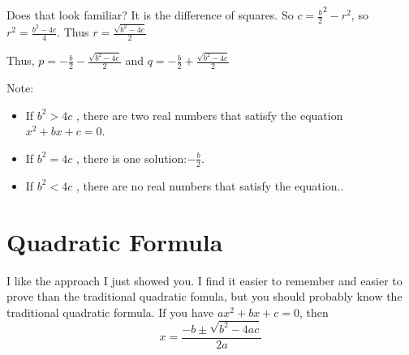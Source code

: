 Does that look familiar? It is the difference of squares.  So
$c = \frac{b}{2}^2 - r^2$, so $r^2 = \frac{b^2 - 4c}{4}$. Thus $r = \frac{\sqrt{b^2 - 4c}}{2}$

Thus, $p = -\frac{b}{2} - \frac{\sqrt{b^2 - 4c}}{2}$
and $q = -\frac{b}{2} + \frac{\sqrt{b^2 - 4c}}{2}$



Note:
\begin{itemize}
\item If $b^2 > 4c$ , there are two real numbers that satisfy the equation $x^2 + bx + c = 0$.
\item If $b^2 = 4c$ , there is one solution:$-\frac{b}{2}$.
\item If $b^2 < 4c$ , there are no real numbers that satisfy the equation..
\end{itemize}

\section{Quadratic Formula}

I like the approach I just showed you. I find it easier to remember
and easier to prove than the traditional quadratic fomula, but you
should probably know the traditional quadratic formula.  If you have $ax^2 + bx + c = 0$, then
\begin{equation*}
  x = \frac{-b \pm \sqrt{b^2 - 4ac}}{2a}
\end{equation*}
